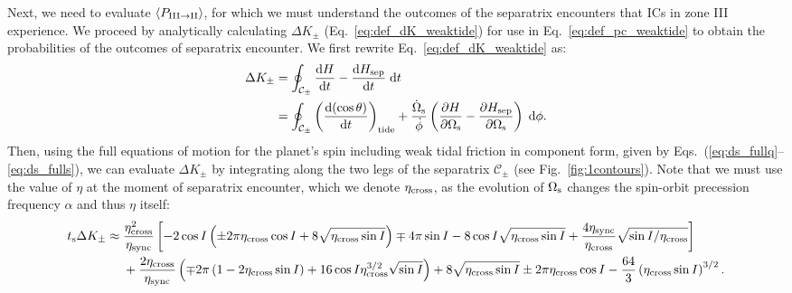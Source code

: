 \documentclass[
        fleqn,
        usenatbib,
    ]{mnras}
\newcommand*{\rd}[2]{\frac{\mathrm{d}#1}{\mathrm{d}#2}}
\newcommand*{\pd}[2]{\frac{\partial#1}{\partial#2}}
\newcommand*{\ev}[1]{\left\langle#1\right\rangle}
\newcommand*{\p}[1]{\left(#1\right)}
\newcommand*{\s}[1]{\left[#1\right]}
\begin{document}
Next, we need to evaluate $\ev{P_{\rm III \to II}}$, for which we must
understand the outcomes of the separatrix encounters that ICs in zone III
experience. We proceed by analytically calculating $\Delta K_{\pm}$
(Eq.~\ref{eq:def_dK_weaktide}) for use in Eq.~\eqref{eq:def_pc_weaktide} to
obtain the probabilities of the outcomes of separatrix encounter. We first
rewrite Eq.~\eqref{eq:def_dK_weaktide} as:
\begin{align}
    \Delta K_{\pm} &= \oint_{\mathcal{C}_{\pm}} \rd{H}{t}
        - \rd{H_{\rm sep}}{t}\;\mathrm{d}t
        \nonumber\\
        &= \oint_{\mathcal{C}_{\pm}}
           \p{\rd{(\cos\theta)}{t}}_{\rm tide}
            + \frac{\dot{\Omega}_{\rm s}}{\dot{\phi}}
            \p{\pd{H}{\Omega_{\rm s}} - \pd{H_{\rm sep}}{\Omega_{\rm s}}}\;\mathrm{d}\phi
                \label{eq:app_dhpm}.
\end{align}
Then, using the full equations of motion for the planet's spin including weak
tidal friction in component form, given by
Eqs.~(\ref{eq:ds_fullq}--\ref{eq:ds_fulls}), we can evaluate $\Delta K_{\pm}$ by
integrating along the two legs of the separatrix $\mathcal{C}_{\pm}$ (see
Fig.~\ref{fig:1contours}). Note that we must use the value of $\eta$ at the
moment of separatrix encounter, which we denote $\eta_{\rm cross}$, as the
evolution of $\Omega_{\rm s}$ changes the spin-orbit precession frequency
$\alpha$ and thus $\eta$ itself:
\begin{align}
    t_{\rm s} \Delta K_{\pm} \approx{}&
        \frac{\eta_{\rm cross}^2}{\eta_{\rm sync}}\s{
            -2\cos I\p{\pm 2\pi \eta_{\rm cross} \cos I
                + 8\sqrt{\eta_{\rm cross} \sin I}}
            \mp 4\pi \sin I
            - 8 \cos I \sqrt{\eta_{\rm cross}\sin I}
                + \frac{4\eta_{\rm sync}}{\eta_{\rm cross}}
                    \sqrt{\sin I/\eta_{\rm cross}}}\nonumber\\
        &+ \frac{2\eta_{\rm cross}}{\eta_{\rm sync}}
            \p{\mp 2\pi\p{1 - 2\eta_{\rm cross} \sin I}
            + 16\cos I \eta_{\rm cross}^{3/2}\sqrt{\sin I}}
            + 8\sqrt{\eta_{\rm cross} \sin I}
            \pm 2 \pi \eta_{\rm cross} \cos I
            - \frac{64}{3} \p{\eta_{\rm cross} \sin I}^{3/2}.
                \label{eq:app_deltaK}
\end{align}
\end{document}
